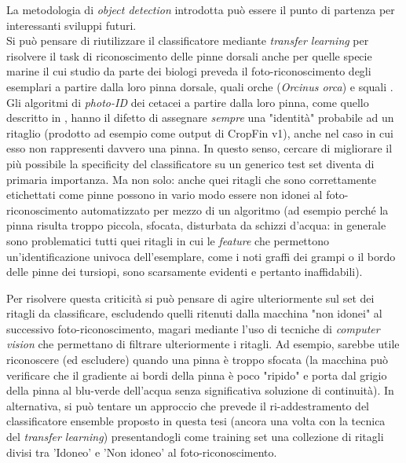 La metodologia di \textit{object detection} introdotta può essere il punto di partenza per interessanti sviluppi futuri.\\

Si può pensare di riutilizzare il classificatore mediante \textit{transfer learning} per risolvere il task di riconoscimento delle pinne dorsali anche per quelle specie marine il cui studio da parte dei biologi preveda il foto-riconoscimento degli esemplari a partire dalla loro pinna dorsale, quali orche (\textit{Orcinus orca}) \cite{orche} e squali \cite{squali}.\\

Gli algoritmi di \textit{photo-ID} dei cetacei a partire dalla loro pinna, come quello descritto in \cite{emanuele}, hanno il difetto di assegnare \emph{sempre} una "identità" probabile ad un ritaglio (prodotto ad esempio come output di CropFin v1), anche nel caso in cui esso non rappresenti davvero una pinna. In questo senso, cercare di migliorare il più possibile la specificity del classificatore su un generico test set diventa di primaria importanza. Ma non solo: anche quei ritagli che sono correttamente etichettati come pinne possono in vario modo essere non idonei al foto-riconoscimento automatizzato per mezzo di un algoritmo (ad esempio perché la pinna risulta troppo piccola, sfocata, disturbata da schizzi d'acqua: in generale sono problematici tutti quei ritagli in cui le \textit{feature} che permettono un'identificazione univoca dell'esemplare, come i noti graffi dei grampi o il bordo delle pinne dei tursiopi, sono scarsamente evidenti e pertanto inaffidabili).

Per risolvere questa criticità si può pensare di agire ulteriormente sul set dei ritagli da classificare, escludendo quelli ritenuti dalla macchina "non idonei" al successivo foto-riconoscimento, magari mediante l'uso di tecniche di \textit{computer vision} che permettano di filtrare ulteriormente i ritagli. Ad esempio, sarebbe utile riconoscere (ed escludere) quando una pinna è troppo sfocata (la macchina può verificare che il gradiente ai bordi della pinna è poco "ripido" e porta dal grigio della pinna al blu-verde dell'acqua senza significativa soluzione di continuità).
In alternativa, si può tentare un approccio che prevede il ri-addestramento del classificatore ensemble proposto in questa tesi (ancora una volta con la tecnica del \textit{transfer learning}) presentandogli come training set una collezione di ritagli divisi tra 'Idoneo' e 'Non idoneo' al foto-riconoscimento.\\

